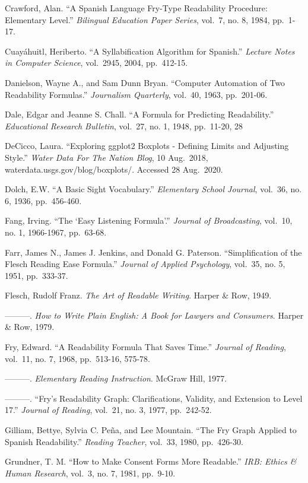\documentclass[
]{book}
\theoremstyle{definition}
\theoremstyle{definition}
\theoremstyle{definition}
\theoremstyle{definition}
\theoremstyle{remark}
\begin{document}
Crawford, Alan. ``A Spanish Language Fry-Type Readability Procedure: Elementary Level.'' \emph{Bilingual Education Paper Series}, vol.~7, no. 8, 1984, pp.~1-17.

Cuayáhuitl, Heriberto. ``A Syllabification Algorithm for Spanish.'' \emph{Lecture Notes in Computer Science}, vol.~2945, 2004, pp.~412-15.

Danielson, Wayne A., and Sam Dunn Bryan. ``Computer Automation of Two Readability Formulas.'' \emph{Journalism Quarterly}, vol.~40, 1963, pp.~201-06.

Dale, Edgar and Jeanne S. Chall. ``A Formula for Predicting Readability.'' \emph{Educational Research Bulletin}, vol.~27, no. 1, 1948, pp.~11-20, 28

DeCicco, Laura. ``Exploring ggplot2 Boxplots - Defining Limits and Adjusting Style.'' \emph{Water Data For The Nation Blog}, 10 Aug.~2018, waterdata.usgs.gov/blog/boxplots/. Accessed 28 Aug.~2020.

Dolch, E.W. ``A Basic Sight Vocabulary.'' \emph{Elementary School Journal}, vol.~36, no. 6, 1936, pp.~456-460.

Fang, Irving. ``The `Easy Listening Formula'.'' \emph{Journal of Broadcasting}, vol.~10, no. 1, 1966-1967, pp.~63-68.

Farr, James N., James J. Jenkins, and Donald G. Paterson. ``Simplification of the Flesch Reading Ease Formula.'' \emph{Journal of Applied Psychology}, vol.~35, no. 5, 1951, pp.~333-37.

Flesch, Rudolf Franz. \emph{The Art of Readable Writing}. Harper \& Row, 1949.

---------. \emph{How to Write Plain English: A Book for Lawyers and Consumers}. Harper \& Row, 1979.

Fry, Edward. ``A Readability Formula That Saves Time.'' \emph{Journal of Reading}, vol.~11, no. 7, 1968, pp.~513-16, 575-78.

---------. \emph{Elementary Reading Instruction}. McGraw Hill, 1977.

---------. ``Fry's Readability Graph: Clarifications, Validity, and Extension to Level 17.'' \emph{Journal of Reading}, vol.~21, no. 3, 1977, pp.~242-52.

Gilliam, Bettye, Sylvia C. Peña, and Lee Mountain. ``The Fry Graph Applied to Spanish Readability.'' \emph{Reading Teacher}, vol.~33, 1980, pp.~426-30.

Grundner, T. M. ``How to Make Consent Forms More Readable.'' \emph{IRB: Ethics \& Human Research}, vol.~3, no. 7, 1981, pp.~9-10.
\end{document}
